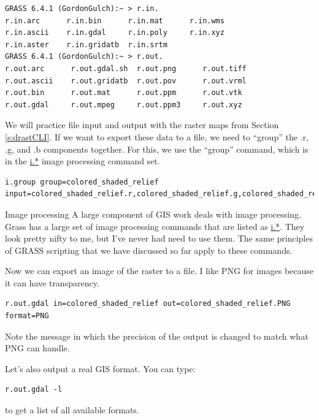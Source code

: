 \documentclass{book}
\begin{document}
\begin{lstlisting}
GRASS 6.4.1 (GordonGulch):~ > r.in.
r.in.arc      r.in.bin      r.in.mat      r.in.wms      
r.in.ascii    r.in.gdal     r.in.poly     r.in.xyz      
r.in.aster    r.in.gridatb  r.in.srtm     
GRASS 6.4.1 (GordonGulch):~ > r.out.
r.out.arc      r.out.gdal.sh  r.out.png      r.out.tiff     
r.out.ascii    r.out.gridatb  r.out.pov      r.out.vrml     
r.out.bin      r.out.mat      r.out.ppm      r.out.vtk      
r.out.gdal     r.out.mpeg     r.out.ppm3     r.out.xyz      
\end{lstlisting}

We will practice file input and output with the raster maps from Section \ref{s:drastCLI}. If we want to export these data to a file, we need to ``group'' the .r, .g, and .b components together. For this, we use the ``group'' command, which is in the \url{i.*} image processing command set.

\begin{lstlisting}
i.group group=colored_shaded_relief input=colored_shaded_relief.r,colored_shaded_relief.g,colored_shaded_relief.b
\end{lstlisting}

\begin{boxx}[!ht]
\begin{bclogo}[arrondi = 0.1, logo = \bcrosevents]{Image processing}
A large component of GIS work deals with image processing. Grass has a large set of image processing commands that are listed as \url{i.*}. They look pretty nifty to me, but I've never had need to use them. The same principles of GRASS scripting that we have discussed so far apply to these commands.
\end{bclogo}
\caption{Image processing}
\end{boxx}

Now we can export an image of the raster to a file. I like PNG for images because it can have transparency.

\begin{lstlisting}
r.out.gdal in=colored_shaded_relief out=colored_shaded_relief.PNG format=PNG
\end{lstlisting}
Note the message in which the precision of the output is changed to match what PNG can handle.

Let's also output a real GIS format. You can type:
\begin{lstlisting}
r.out.gdal -l
\end{lstlisting}
to get a list of all available formats.
\end{document}

